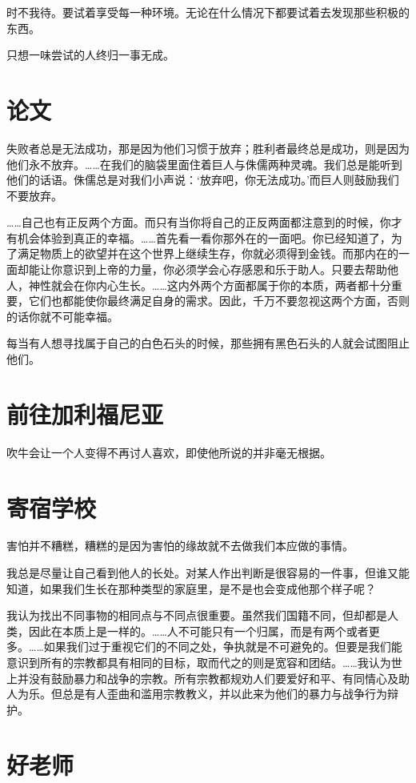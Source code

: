 \documentclass{ctexart}
\begin{document}
时不我待。要试着享受每一种环境。无论在什么情况下都要试着去发现那些积极的东西。

只想一味尝试的人终归一事无成。

\section{论文}

失败者总是无法成功，那是因为他们习惯于放弃；胜利者最终总是成功，则是因为他们永不放弃。……在我们的脑袋里面住着巨人与侏儒两种灵魂。我们总是能听到他们的话语。侏儒总是对我们小声说：‘放弃吧，你无法成功。’而巨人则鼓励我们不要放弃。

……自己也有正反两个方面。而只有当你将自己的正反两面都注意到的时候，你才有机会体验到真正的幸福。……首先看一看你那外在的一面吧。你已经知道了，为了满足物质上的欲望并在这个世界上继续生存，你就必须得到金钱。而那内在的一面却能让你意识到上帝的力量，你必须学会心存感恩和乐于助人。只要去帮助他人，神性就会在你内心生长。……这内外两个方面都属于你的本质，两者都十分重要，它们也都能使你最终满足自身的需求。因此，千万不要忽视这两个方面，否则的话你就不可能幸福。

每当有人想寻找属于自己的白色石头的时候，那些拥有黑色石头的人就会试图阻止他们。

\section{前往加利福尼亚}

吹牛会让一个人变得不再讨人喜欢，即使他所说的并非毫无根据。

\section{寄宿学校}

害怕并不糟糕，糟糕的是因为害怕的缘故就不去做我们本应做的事情。

我总是尽量让自己看到他人的长处。对某人作出判断是很容易的一件事，但谁又能知道，如果我们生长在那种类型的家庭里，是不是也会变成他那个样子呢？

我认为找出不同事物的相同点与不同点很重要。虽然我们国籍不同，但却都是人类，因此在本质上是一样的。……人不可能只有一个归属，而是有两个或者更多。……如果我们过于重视它们的不同之处，争执就是不可避免的。但要是我们能意识到所有的宗教都具有相同的目标，取而代之的则是宽容和团结。……我认为世上并没有鼓励暴力和战争的宗教。所有宗教都规劝人们要爱好和平、有同情心及助人为乐。但总是有人歪曲和滥用宗教教义，并以此来为他们的暴力与战争行为辩护。

\section{好老师}
\end{document}
